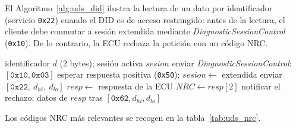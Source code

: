 El Algoritmo~\ref{alg:uds_did} ilustra la lectura de un dato por identificador (servicio \texttt{0x22}) cuando el DID es de acceso restringido: antes de la lectura, el cliente debe conmutar a sesión extendida mediante \textit{DiagnosticSessionControl} (\texttt{0x10}). De lo contrario, la ECU rechaza la petición con un código NRC.

\begin{algorithm}[H]
\caption{Lectura de un dato por identificador en UDS (servicio \texttt{0x22}).}
\label{alg:uds_did}
\begin{algorithmic}[1]
\Require identificador $d$ (2 bytes); sesión activa $sesion$
    \State enviar \textit{DiagnosticSessionControl}: $[\texttt{0x10}, \texttt{0x03}]$
    \State esperar respuesta positiva (\texttt{0x50}); $sesion \gets$ extendida
\EndIf
\State enviar $[\texttt{0x22},\ d_{hi},\ d_{lo}]$
\State $resp \gets$ respuesta de la ECU
 
    \State $NRC \gets resp[2]$ 
    \State notificar el rechazo; \Return
\EndIf
\State \Return datos de $resp$ tras $[\texttt{0x62}, d_{hi}, d_{lo}]$
\end{algorithmic}
\end{algorithm}

Los códigos NRC más relevantes se recogen en la tabla~\ref{tab:uds_nrc}.

